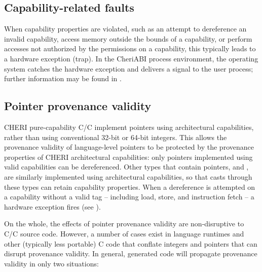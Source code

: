 \documentclass[12pt,twoside,openright,usletter]{article}
\newcommand{\ccode}[1]{{\small\ttfamily{#1}}}
\newcommand{\cuintptrt}{{\ccode{uintptr\_t}}\xspace}
\newcommand{\cintptrt}{{\ccode{intptr\_t}}\xspace}
\newcommand{\SIGPROT}{{\ccode{SIGPROT}}\xspace}
\newcommand{\note}[2]{{\color{blue}[ Note: #1 - #2]}}
\renewcommand{\note}[2]{\relax\ifhmode\unskip\fi}
\newcommand{\arnote}[1]{\note{#1}{Alex R.}}
\newcommand{\rwnote}[1]{\note{#1}{Robert W.}}
\newcommand{\psnote}[1]{\note{#1}{Peter S.}}
\newcommand*{\cpp}[1][]{C\textsmaller[2]{\nolinebreak[4]\hspace{-.05em}\raisebox{.45ex}{\textbf{++}}}}
\newcommand*{\purecapCOrCpp}[1]{CHERI pure-capability C/\cpp{}}
\begin{document}
\subsection{Capability-related faults}
\label{sec:faults}

When capability properties are violated, such as an attempt to dereference an
invalid capability, access memory outside the bounds of a capability, or perform
accesses not authorized by the permissions on a capability, this typically
leads to a hardware exception (trap).
In the CheriABI process environment, the operating system catches the hardware
exception and delivers a \SIGPROT signal to the user process;
further information may be found in .

\rwnote{We've opted to use the term ``hardware exception'' throughout, and
  mention ``traps'' only here.  This could cause confusion with respect to \cpp{}
  exceptions .. but perhaps less so than if we used the word ``exception''
  unadorned.}

\subsection{Pointer provenance validity}
\label{sec:pointer_provenance_validity}

\purecapCOrCpp{} implement pointers using architectural
capabilities, rather than using conventional 32-bit or 64-bit integers.
This allows the provenance validity of language-level pointers to be
protected by the provenance properties of CHERI architectural capabilities:
only pointers implemented using valid capabilities can be dereferenced.
Other types that contain pointers, \cuintptrt and \cintptrt,
are similarly implemented
using architectural capabilities, so that casts through these types
can retain capability properties.
When a dereference is attempted on a capability without a valid tag --
including load, store, and instruction fetch -- a hardware exception fires
(see ).

On the whole, the effects of pointer provenance validity are non-disruptive to
C/\cpp{} source code.
However, a number of cases exist in language runtimes and other
(typically less portable) C code that conflate integers and pointers that can
disrupt provenance validity.
In general, generated code will propagate provenance validity in only two
situations:
\end{document}
